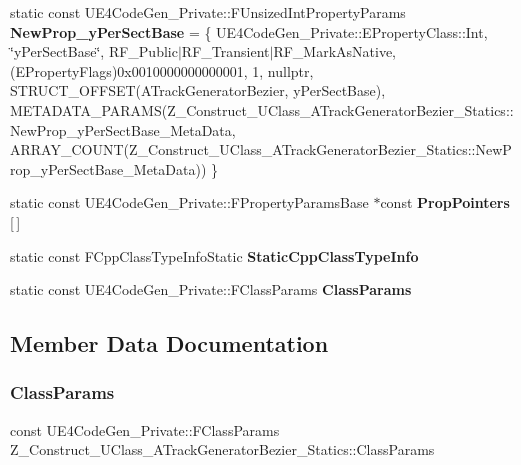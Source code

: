 \begin{DoxyCompactItemize}
\item 
\mbox{\label{struct_z___construct___u_class___a_track_generator_bezier___statics_aa70ca7b0a4f05d7fca9e18ea672871a9}} 
static const U\+E4\+Code\+Gen\+\_\+\+Private\+::\+F\+Unsized\+Int\+Property\+Params {\bfseries New\+Prop\+\_\+y\+Per\+Sect\+Base} = \{ U\+E4\+Code\+Gen\+\_\+\+Private\+::\+E\+Property\+Class\+::\+Int, \char`\"{}y\+Per\+Sect\+Base\char`\"{}, R\+F\+\_\+\+Public$\vert$R\+F\+\_\+\+Transient$\vert$R\+F\+\_\+\+Mark\+As\+Native, (E\+Property\+Flags)0x0010000000000001, 1, nullptr, S\+T\+R\+U\+C\+T\+\_\+\+O\+F\+F\+S\+E\+T(\+A\+Track\+Generator\+Bezier, y\+Per\+Sect\+Base), M\+E\+T\+A\+D\+A\+T\+A\+\_\+\+P\+A\+R\+A\+M\+S(\+Z\+\_\+\+Construct\+\_\+\+U\+Class\+\_\+\+A\+Track\+Generator\+Bezier\+\_\+\+Statics\+::\+New\+Prop\+\_\+y\+Per\+Sect\+Base\+\_\+\+Meta\+Data, A\+R\+R\+A\+Y\+\_\+\+C\+O\+U\+N\+T(\+Z\+\_\+\+Construct\+\_\+\+U\+Class\+\_\+\+A\+Track\+Generator\+Bezier\+\_\+\+Statics\+::\+New\+Prop\+\_\+y\+Per\+Sect\+Base\+\_\+\+Meta\+Data)) \}
\item 
static const U\+E4\+Code\+Gen\+\_\+\+Private\+::\+F\+Property\+Params\+Base $\ast$const {\bfseries Prop\+Pointers} \mbox{[}$\,$\mbox{]}
\item 
static const F\+Cpp\+Class\+Type\+Info\+Static {\bfseries Static\+Cpp\+Class\+Type\+Info}
\item 
static const U\+E4\+Code\+Gen\+\_\+\+Private\+::\+F\+Class\+Params {\bfseries Class\+Params}
\end{DoxyCompactItemize}


\subsection{Member Data Documentation}
\mbox{\label{struct_z___construct___u_class___a_track_generator_bezier___statics_a8e00b6f69a88066ce77bb9d9c524d7b4}} 
\subsubsection{\texorpdfstring{ClassParams}{ClassParams}}
{\footnotesize\ttfamily const U\+E4\+Code\+Gen\+\_\+\+Private\+::\+F\+Class\+Params Z\+\_\+\+Construct\+\_\+\+U\+Class\+\_\+\+A\+Track\+Generator\+Bezier\+\_\+\+Statics\+::\+Class\+Params\hspace{0.3cm}{\ttfamily [static]}}

